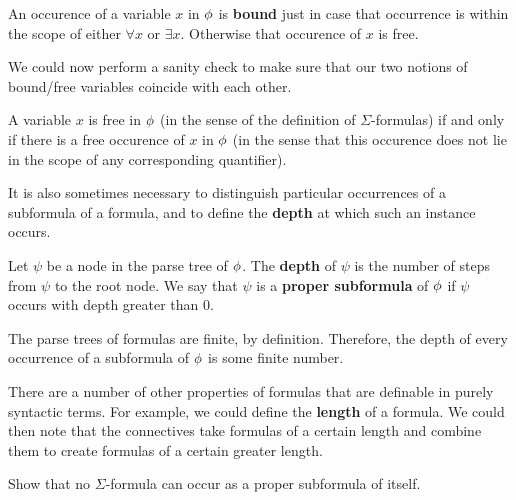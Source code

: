 \begin{defn} An occurence of a variable
  $x$ in $\phi$ is \textbf{bound} just in case that occurrence is
  within the scope of either $\forall x$ or $\exists x$.  Otherwise
  that occurence of $x$ is free. \end{defn}

We could now perform a sanity check to make sure that our two notions
of bound/free variables coincide with each other.

\begin{fact} A variable $x$ is free in $\phi$ (in the sense of the
  definition of $\Sigma$-formulas) if and only if there is a free
  occurence of $x$ in $\phi$ (in the sense that this occurence does not
  lie in the scope of any corresponding quantifier).  \end{fact}


It is also sometimes necessary to distinguish particular occurrences
of a subformula of a formula, and to define the \textbf{depth} at
which such an instance occurs.

\begin{defn} Let $\psi$ be a node in the parse tree of $\phi$.  The
  \textbf{depth} of $\psi$ is the number of steps from $\psi$ to the
  root node.  We say that $\psi$ is a \textbf{proper subformula} of
  $\phi$ if $\psi$ occurs with depth greater than $0$. \end{defn}

The parse trees of formulas are finite, by definition.  Therefore, the
depth of every occurrence of a subformula of $\phi$ is some finite
number.

There are a number of other properties of formulas that are definable
in purely syntactic terms.  For example, we could define the
\textbf{length} of a formula.  We could then note that the connectives
take formulas of a certain length and combine them to create formulas
of a certain greater length.

\begin{exercise} Show that no $\Sigma$-formula can occur as a proper
  subformula of itself. \end{exercise}



